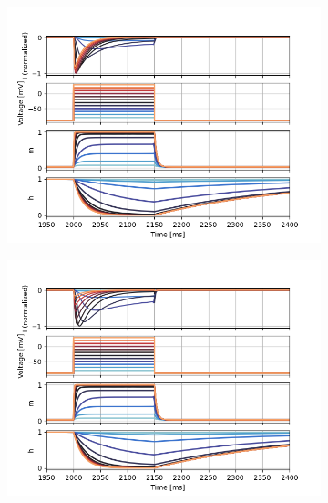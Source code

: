 \documentclass[../../workflow.tex]{subfiles}
\begin{document}
\begin{figure}[H]
    \centering
    \begin{subfigure}[t]{0.45\textwidth}
        \centering
        \includegraphics[width=\textwidth]{./img/t_type_calcium_channel/simulations/No Scale/Ohm's LawVoltage Step Up-Down6_voltage_traces.png}
        \caption{}
        \label{fig_t_type_ohmic_voltage_traces}
    \end{subfigure}
    \hfill
    \begin{subfigure}[t]{0.45\textwidth}
        \centering
        \includegraphics[width=\textwidth]{./img/t_type_calcium_channel/simulations/No Scale/Constant Field EquationVoltage Step Up-Down6_voltage_traces.png}
        \caption{}
        \label{fig_t_type_constant_field_voltage_traces}
    \end{subfigure}


\end{figure}
\end{document}
